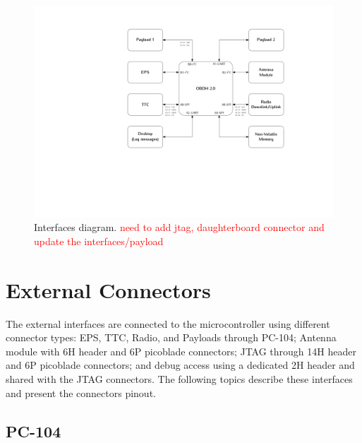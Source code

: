 \begin{figure}[!ht]
    \begin{center}
        \includegraphics[width=\textwidth]{figures/diagram_interfaces.pdf}
        \caption{Interfaces diagram. \textcolor{red}{need to add jtag, daughterboard connector and update the interfaces/payload}}
        \label{fig:diagram-interfaces}
    \end{center}
\end{figure}

\section{External Connectors}

The external interfaces are connected to the microcontroller using different connector types: EPS, TTC, Radio, and Payloads through PC-104; Antenna module with 6H header and 6P picoblade connectors; JTAG through 14H header and 6P picoblade connectors; and debug access using a dedicated 2H header and shared with the JTAG connectors. The following topics describe these interfaces and present the connectors pinout.

\subsection{PC-104}

